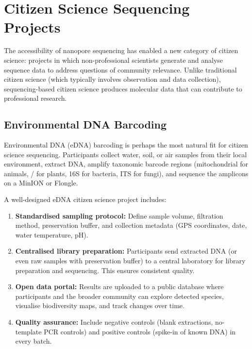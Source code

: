 \section{Citizen Science Sequencing Projects}
\label{sec:accessible:citizenscience}

The accessibility of nanopore sequencing has enabled a new category of citizen science: projects in which non-professional scientists generate and analyse sequence data to address questions of community relevance. Unlike traditional citizen science (which typically involves observation and data collection), sequencing-based citizen science produces molecular data that can contribute to professional research.

\subsection{Environmental DNA Barcoding}
\label{subsec:accessible:edna}

Environmental DNA (eDNA) barcoding is perhaps the most natural fit for citizen science sequencing. Participants collect water, soil, or air samples from their local environment, extract DNA, amplify taxonomic barcode regions (mitochondrial  for animals, / for plants, 16S for bacteria, ITS for fungi), and sequence the amplicons on a MinION or Flongle.

A well-designed eDNA citizen science project includes:

\begin{enumerate}[itemsep=2pt]
  \item \textbf{Standardised sampling protocol:} Define sample volume, filtration method, preservation buffer, and collection metadata (GPS coordinates, date, water temperature, pH).
  \item \textbf{Centralised library preparation:} Participants send extracted DNA (or even raw samples with preservation buffer) to a central laboratory for library preparation and sequencing. This ensures consistent quality.
  \item \textbf{Open data portal:} Results are uploaded to a public database where participants and the broader community can explore detected species, visualise biodiversity maps, and track changes over time.
  \item \textbf{Quality assurance:} Include negative controls (blank extractions, no-template \acrshort{PCR} controls) and positive controls (spike-in of known DNA) in every batch.
\end{enumerate}

